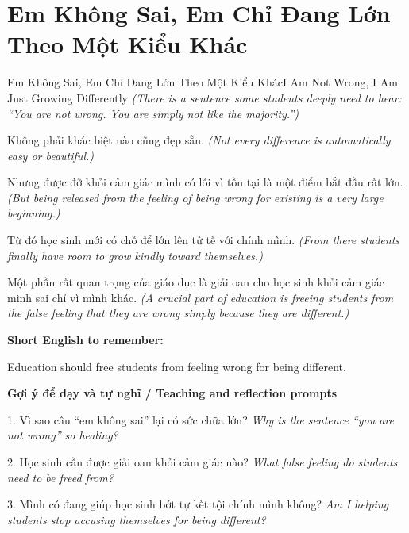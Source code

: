 \section{Em Không Sai, Em Chỉ Đang Lớn Theo Một Kiểu Khác}
\begin{truyen}{Em Không Sai, Em Chỉ Đang Lớn Theo Một Kiểu Khác}{I Am Not Wrong, I Am Just Growing Differently}
\textit{(There is a sentence some students deeply need to hear: “You are not wrong. You are simply not like the majority.”)}

Không phải khác biệt nào cũng đẹp sẵn.
\textit{(Not every difference is automatically easy or beautiful.)}

Nhưng được đỡ khỏi cảm giác mình có lỗi vì tồn tại là một điểm bắt đầu rất lớn.
\textit{(But being released from the feeling of being wrong for existing is a very large beginning.)}

Từ đó học sinh mới có chỗ để lớn lên tử tế với chính mình.
\textit{(From there students finally have room to grow kindly toward themselves.)}

\end{truyen}

\begin{baihoc}
Một phần rất quan trọng của giáo dục là giải oan cho học sinh khỏi cảm giác mình sai chỉ vì mình khác.
\textit{(A crucial part of education is freeing students from the false feeling that they are wrong simply because they are different.)}
\end{baihoc}

\begin{ghinhoanh}
\textbf{Short English to remember:}

Education should free students from feeling wrong for being different.

\end{ghinhoanh}

\begin{tuhocnhanh}
\textbf{Gợi ý để dạy và tự nghĩ / Teaching and reflection prompts}

1. Vì sao câu “em không sai” lại có sức chữa lớn? \textit{Why is the sentence “you are not wrong” so healing?}

2. Học sinh cần được giải oan khỏi cảm giác nào? \textit{What false feeling do students need to be freed from?}

3. Mình có đang giúp học sinh bớt tự kết tội chính mình không? \textit{Am I helping students stop accusing themselves for being different?}
\end{tuhocnhanh}
